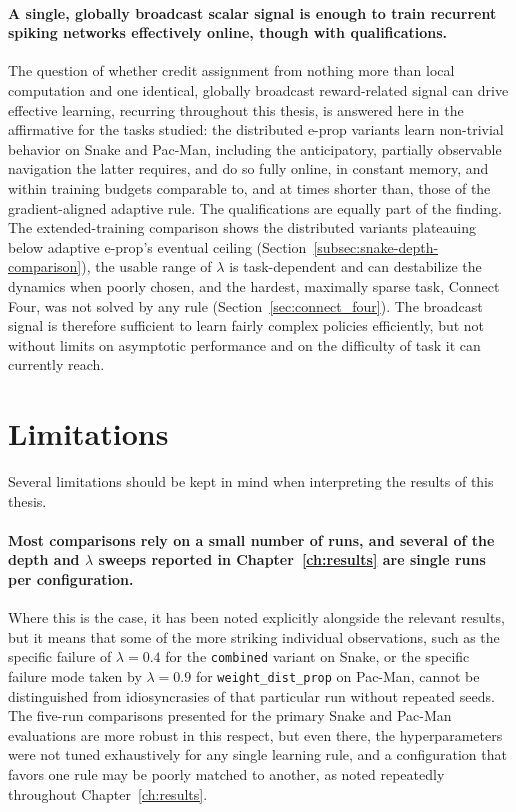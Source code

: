 \paragraph{A single, globally broadcast scalar signal is enough to train recurrent spiking networks
effectively online, though with qualifications.} The question of whether credit assignment from
nothing more than local computation and one identical, globally broadcast reward-related signal can
drive effective learning, recurring throughout this thesis, is answered here in the affirmative for
the tasks studied: the distributed e-prop variants learn non-trivial behavior on Snake and Pac-Man,
including the anticipatory, partially observable navigation the latter requires, and do so fully
online, in constant memory, and within training budgets comparable to, and at times shorter than,
those of the gradient-aligned adaptive rule. The qualifications are equally part of the finding. The
extended-training comparison shows the distributed variants plateauing below adaptive e-prop's
eventual ceiling (Section~\ref{subsec:snake-depth-comparison}), the usable range of $\lambda$ is
task-dependent and can destabilize the dynamics when poorly chosen, and the hardest, maximally
sparse task, Connect Four, was not solved by any rule (Section~\ref{sec:connect_four}). The
broadcast signal is therefore sufficient to learn fairly complex policies efficiently, but not
without limits on asymptotic performance and on the difficulty of task it can currently reach.

\section{Limitations}
\label{sec:limitations}

Several limitations should be kept in mind when interpreting the results
of this thesis.

\paragraph{Most comparisons rely on a small number of runs, and several of
the depth and $\lambda$ sweeps reported in
Chapter~\ref{ch:results} are single runs per configuration.} Where
this is the case, it has been noted explicitly alongside the relevant
results, but it means that some of the more striking individual
observations, such as the specific failure of $\lambda = 0.4$ for the
\texttt{combined} variant on Snake, or the specific failure mode taken by
$\lambda = 0.9$ for \texttt{weight\_dist\_prop} on Pac-Man, cannot be
distinguished from idiosyncrasies of that particular run without repeated
seeds. The five-run comparisons presented for the primary Snake and
Pac-Man evaluations are more robust in this respect, but even there, the
hyperparameters were not tuned exhaustively for any single learning rule,
and a configuration that favors one rule may be poorly matched to
another, as noted repeatedly throughout Chapter~\ref{ch:results}.

